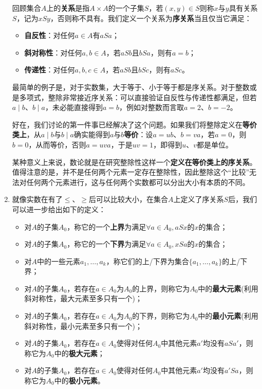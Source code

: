 \documentclass[a4paper,UTF8,fontset=windows,AutoFakeBold]{ctexart}
\begin{document}
\begin{enumerate}
    回顾集合$A$上的\textbf{关系}是指$A\times A$的一个子集$S$，若$(x,y)\in S$则称$x$与$y$具有关系$S$，记为$xSy$，否则称不具有。我们定义一个关系为\textbf{序关系}当且仅当它满足：
    \begin{itemize}
        \item \textbf{自反性}：对任何$a\in A$有$aSa$；
        \item \textbf{斜对称性}：对任何$a,b\in A$，若$aSb$且$bSa$，则有$a=b$；
        \item \textbf{传递性}：对任何$a,b,c\in A$，若$aSb$且$bSc$，则有$aSc$。
    \end{itemize}

    最简单的例子是，对于实数集，大于等于、小于等于都是序关系。对于整数或是多项式，整除非常接近序关系：可以直接验证自反性与传递性都满足，但若$a\mid b$、$b\mid a$，未必能直接得到$a=b$，例如对整数而言取$a=2$、$b=-2$。

    好在，我们讨论的第一件事已经解决了这个问题。如果我们将整除定义在\textbf{等价类上}，从$a\mid b$与$b\mid a$确实能得到$a$与$b$\textbf{等价}：设$a=ub$、$b=va$，若$a=0$，则$b=0$，从而等价，否则$a=uva$，于是$uv=1$，即得到$u$、$v$都是单位。

    某种意义上来说，数论就是在研究整除性这样一个\textbf{定义在等价类上的序关系}。值得注意的是，并不是任何两个元素一定存在整除性，因此整除这个``比较''无法对任何两个元素进行，这与任何两个实数都可以分出大小有本质的不同。

    \item 就像实数在有了$\le$、$\ge$后可以比较大小，在集合$A$上定义了序关系$S$后，我们可以进一步给出如下的定义：
    \begin{itemize}
        \item 对$A$的子集$A_0$，称它的一个\textbf{上界}为满足$\forall a\in A_0,aSx$的$x$的集合；
        \item 对$A$的子集$A_0$，称它的一个\textbf{下界}为满足$\forall a\in A_0,xSa$的$x$的集合；
        \item 对$A$中的一些元素$a_1,\dots,a_k$，称它们的上/下界为集合$\{a_1,\dots,a_k\}$的上/下界；
        \item 对$A$的子集$A_0$，若存在$a\in A_0$为$A_0$的上界，则称它为$A_0$中的\textbf{最大元素}(利用斜对称性，最大元素至多只有一个)；
        \item 对$A$的子集$A_0$，若存在$a\in A_0$为$A_0$的下界，则称它为$A_0$中的\textbf{最小元素}(利用斜对称性，最小元素至多只有一个)；
        \item 对$A$的子集$A_0$，若存在$a\in A_0$使得对任何$A_0$中其他元素$a'$均没有$aSa'$，则称它为$A_0$中的\textbf{极大元素}；
        \item 对$A$的子集$A_0$，若存在$a\in A_0$使得对任何$A_0$中其他元素$a'$均没有$a'Sa$，则称它为$A_0$中的\textbf{极小元素}。
    \end{itemize}


\end{enumerate}
\end{document}
